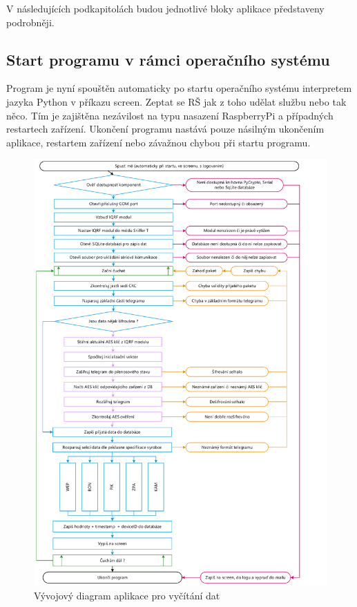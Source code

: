 V následujících podkapitolách budou jednotlivé bloky aplikace představeny podrobněji.

\subsection{Start programu v rámci operačního systému}
Program je nyní spouštěn automaticky po startu operačního systému interpretem jazyka Python v příkazu screen. \colorbox[rgb]{0,1,0}{Zeptat se RŠ jak z toho udělat službu nebo tak něco.} Tím je zajištěna nezávilost na typu nasazení RaspberryPi a případných restartech zařízení. Ukončení programu nastává pouze násilným ukončením aplikace, restartem zařízení nebo závažnou chybou při startu programu. 

 \begin{figure}[!]
  \begin{center}
    \includegraphics[scale=0.6]{obrazky/aplikace_diagram}
  \end{center}
  \caption{Vývojový diagram aplikace pro vyčítání dat}
	\label{AplikaceDiagram}
\end{figure}

